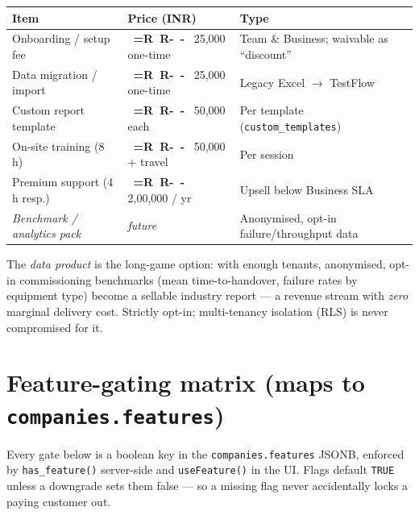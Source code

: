 \documentclass[11pt,a4paper]{article}
\newcommand{\Rs}{%
  \mbox{%
    \sffamily\bfseries
    \setbox0=\hbox{R}%
    R\kern-\wd0
    \raisebox{0.42em}{\rule{0.55em}{0.07em}}%
    \kern-\wd0
    \raisebox{0.25em}{\rule{0.55em}{0.07em}}%
    \kern\wd0
  }%
}
\newcommand{\flag}[1]{\texttt{#1}}
\begin{document}
\begin{center}
\begin{tabular}{@{}L{5.2cm} R{3.2cm} L{5.5cm}@{}}
  \toprule
  \textbf{Item} & \textbf{Price (INR)} & \textbf{Type} \\
  \midrule
  Onboarding / setup fee        & \Rs 25{,}000 one-time  & Team \& Business; waivable as ``discount'' \\
  Data migration / import       & \Rs 25{,}000 one-time  & Legacy Excel $\rightarrow$ TestFlow \\
  Custom report template        & \Rs 50{,}000 each      & Per template (\flag{custom\_templates}) \\
  On-site training (8\,h)       & \Rs 50{,}000 + travel  & Per session \\
  Premium support (4\,h resp.)  & \Rs 2{,}00{,}000 / yr  & Upsell below Business SLA \\
  \textit{Benchmark / analytics pack} & \textit{future}  & Anonymised, opt-in failure/throughput data \\
  \bottomrule
\end{tabular}
\end{center}

\noindent The \emph{data product} is the long-game option: with enough tenants,
anonymised, opt-in commissioning benchmarks (mean time-to-handover, failure rates
by equipment type) become a sellable industry report --- a revenue stream with
\emph{zero} marginal delivery cost. Strictly opt-in; multi-tenancy isolation
(RLS) is never compromised for it.

\section{Feature-gating matrix (maps to \texttt{companies.features})}

Every gate below is a boolean key in the \texttt{companies.features} JSONB,
enforced by \texttt{has\_feature()} server-side and \texttt{useFeature()} in the
UI. Flags default \texttt{TRUE} unless a downgrade sets them false --- so a missing
flag never accidentally locks a paying customer out.
\end{document}

